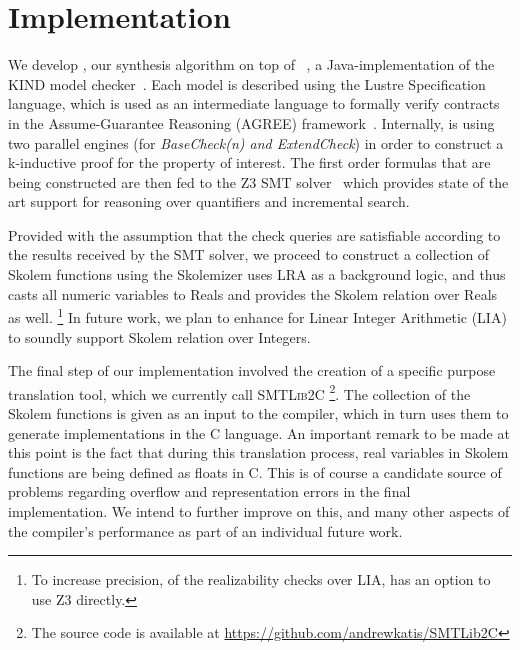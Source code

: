 \section{Implementation}
\label{sec:impl}

We develop \jkindsynt, our synthesis algorithm on top of \jkind~\cite{jkind},
a Java-implementation of the \textsc{KIND} model
checker~\cite{Hagen08:kind}. Each model is described using the Lustre
Specification language, which is used as an intermediate language to formally verify contracts in the
Assume-Guarantee Reasoning (\textsc{AGREE}) framework~\cite{NFM2012:CoGaMiWhLaLu}.
Internally, \jkind is using two parallel engines (for \textit{BaseCheck(n) and
\textit{ExtendCheck}}) in order to construct a k-inductive proof for the
property of interest.
The first order formulas that are being constructed are then fed to the \textsc{Z3} SMT
solver~\cite{DeMoura08:z3} which provides state of the art support for reasoning
over quantifiers and incremental search.

Provided with the assumption that the check queries are satisfiable according to
the results received by the SMT solver, we proceed to construct a collection of
Skolem functions using the \aeval Skolemizer%
\aeval  uses LRA as a background logic, and thus casts all numeric variables to Reals and provides the Skolem relation over Reals as well.%
\footnote{To increase precision, of the realizability checks over LIA, \jkind has an option to use \textsc{Z3} directly.}
In future work, we plan to enhance  \aeval for Linear Integer Arithmetic (LIA) to soundly support Skolem relation over Integers.

The final step of our implementation involved the creation of a specific purpose
translation tool, which we currently call \textsc{SMTLib2C}%
\footnote{The source code
is available at \url{https://github.com/andrewkatis/SMTLib2C}}. The collection
of the Skolem functions is given as an input to the compiler, which in turn uses
them to generate implementations in the C language. An important remark to be
made at this point is the fact that during this translation process, real
variables in Skolem functions are being defined as floats in C. This is of
course a candidate source of problems regarding overflow and representation
errors in the final implementation. We intend to further improve on this, and
many other aspects of the compiler's performance as part of an individual
future work.



